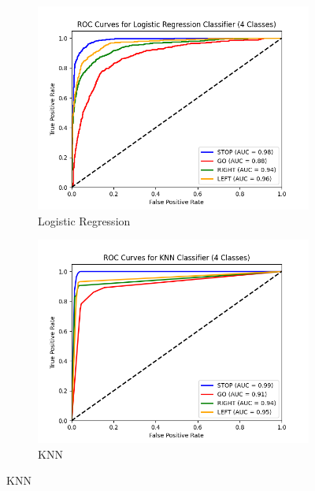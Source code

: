\begin{figure}[h]
\centering
\begin{subfigure}{0.48\textwidth}
    \includegraphics[width=\linewidth]{img/classifier/logistic_regression_AUC.png}
    \caption{Logistic Regression}
\end{subfigure}
\begin{subfigure}{0.48\textwidth}
    \includegraphics[width=\linewidth]{img/classifier/KNN_AUC.png}
    \caption{KNN}
\end{subfigure}

\vspace{0.5em}


\end{figure}
